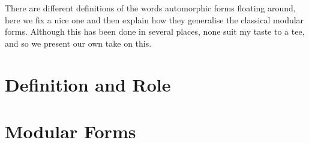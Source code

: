 There are different definitions of the words automorphic forms floating around, here we fix a nice one and then explain how they generalise the classical modular forms. Although this has been done in several places, none suit my taste to a tee, and so we present our own take on this. 

\section{Definition and Role}

\section{Modular Forms}